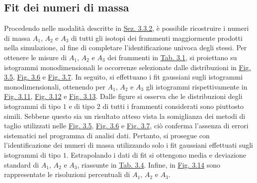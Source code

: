\documentclass[12pt,a4paper,twoside]{report}
\begin{document}
	\subsection{Fit dei numeri di massa}
	Procedendo nelle modalità descritte in \hyperref[sec:selection_number_of_mass]{Sez. 3.3.2}, è possibile ricostruire i numeri di massa $A_1$, $A_2$ e $A_3$ di tutti gli isotopi dei frammenti maggiormente prodotti nella simulazione, al fine di completare l'identificazione univoca degli stessi. Per ottenere le misure di $A_1$, $A_2$ e $A_3$ dei frammenti in \hyperref[tab:fragments]{Tab. 3.1}, si proiettano su istogrammi monodimensionali le occorrenze selezionate dalle distribuzioni in \hyperref[fig:a1_cut]{Fig. 3.5}, \hyperref[fig:a2_cut]{Fig. 3.6} e \hyperref[fig:a3_cut]{Fig. 3.7}. In seguito, si effettuano i fit gaussiani sugli istogrammi monodimensionali, ottenendo per $A_1$, $A_2$ e $A_3$ gli istogrammi rispettivamente in \hyperref[fig:a1_fragments_final]{Fig. 3.11}, \hyperref[fig:a2_fragments_final]{Fig. 3.12} e \hyperref[fig:a3_fragments_final]{Fig. 3.13}. Dalle figure si osserva che le distribuzioni degli istogrammi di tipo $1$ e di tipo $2$ di tutti i frammenti considerati sono piuttosto simili. Sebbene questo sia un risultato atteso vista la somiglianza dei metodi di taglio utilizzati nelle \hyperref[fig:a1_cut]{Fig. 3.5}, \hyperref[fig:a2_cut]{Fig. 3.6} e \hyperref[fig:a3_cut]{Fig. 3.7}, ciò conferma l'assenza di errori sistematici nel programma di analisi dati. Pertanto, si prosegue con l'identificazione dei numeri di massa utilizzando solo i fit gaussiani effettuati sugli istogrammi di tipo $1$. Estrapolando i dati di fit si ottengono media e deviazione standard di $A_1$, $A_2$ e $A_3$, riassunte in \hyperref[tab:mass_numbers]{Tab. 3.4}. Infine, in \hyperref[fig:number_mass_resolution]{Fig. 3.14} sono rappresentate le risoluzioni percentuali di $A_1$, $A_2$ e $A_3$.
\end{document}
